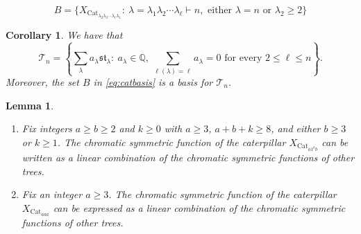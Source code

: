 \documentclass[10pt,a4paper]{amsart}
\newtheorem{corollary}{Corollary}
\newtheorem{lemma}{Lemma}
\begin{document}
\begin{equation}\label{eq:catbasis}
B=\{X_{\text{Cat}_{\lambda_2\lambda_3\cdots\lambda_\ell\lambda_1}}: \ \lambda=\lambda_1\lambda_2\cdots\lambda_\ell\vdash n, \text{ either }\lambda=n\text{ or } \lambda_2\geq 2\}
\end{equation}

\begin{corollary}\label{cor:catbasis}
We have that
\begin{equation}\label{eq:treespan}
\mathcal T_n=\left\{\sum_\lambda a_\lambda\mathfrak{st}_\lambda: \ a_\lambda\in\mathbb Q, \ \sum_{\ell(\lambda)=\ell}a_\lambda=0\text{ for every }2\leq\ell\leq n\right\}.
\end{equation}
Moreover, the set $B$ in \eqref{eq:catbasis} is a basis for $\mathcal T_n$. 
\end{corollary}

\begin{lemma}\hspace{0pt}
\label{lem:ab1k}
\begin{enumerate}
\item Fix integers $a\geq b\geq 2$ and $k\geq 0$ with $a\geq 3$, $a+b+k\geq 8$, and either $b\geq 3$ or $k\geq 1$. The chromatic symmetric function of the caterpillar $X_{\text{Cat}_{a1^kb}}$ can be written as a linear combination of the chromatic symmetric functions of other trees. 
\item Fix an integer $a\geq 3$. The chromatic symmetric function of the caterpillar $X_{\text{Cat}_{aaa}}$ can be expressed as a linear combination of the chromatic symmetric functions of other trees.
\end{enumerate}
\end{lemma}
\end{document}
